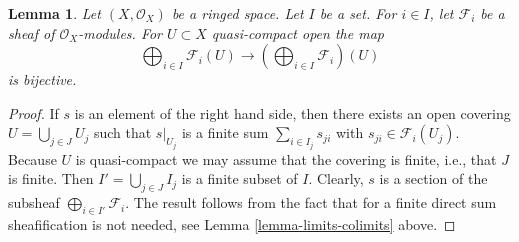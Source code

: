 \documentclass[10pt,a4paper]{amsart}
\theoremstyle{plain}
\newtheorem{lemma}[subsection]{Lemma}
\theoremstyle{definition}
\theoremstyle{remark}
\numberwithin{equation}{subsection}
\begin{document}
\begin{lemma}
\label{lemma-section-direct-sum-quasi-compact}
Let $(X, \mathcal{O}_X)$ be a ringed space.
Let $I$ be a set. For $i \in I$, let $\mathcal{F}_i$
be a sheaf of $\mathcal{O}_X$-modules.
For $U \subset X$ quasi-compact open the map
$$
\bigoplus\nolimits_{i \in I} \mathcal{F}_i(U)
\longrightarrow
\left(\bigoplus\nolimits_{i \in I} \mathcal{F}_i\right)(U)
$$
is bijective.
\end{lemma}

\begin{proof}
If $s$ is an element of the right hand side, then
there exists an open covering $U = \bigcup_{j \in J} U_j$
such that $s|_{U_j}$ is a finite sum
$\sum_{i \in I_j} s_{ji}$ with $s_{ji} \in \mathcal{F}_i(U_j)$.
Because $U$ is quasi-compact we may assume that the
covering is finite, i.e., that $J$ is finite.
Then $I' = \bigcup_{j \in J} I_j$ is a finite subset of
$I$. Clearly, $s$ is a section of the subsheaf
$\bigoplus_{i \in I'} \mathcal{F}_i$. The result follows
from the fact that for a finite direct sum sheafification
is not needed, see Lemma \ref{lemma-limits-colimits} above.
\end{proof}
\end{document}
